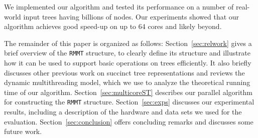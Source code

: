 We implemented our algorithm and tested its performance on a number of
real-world input trees having billions of nodes.
Our experiments showed that our algorithm achieves good speed-up on up to
64 cores and likely beyond.

The remainder of this paper is organized as follows:
Section~\ref{sec:relwork} gives a brief overview of the {\tt RMMT} structure,
to clearly define its structure and illustrate how it can be used to support
basic operations on trees efficiently.
It also briefly discusses other previous work on succinct tree representations
and reviews the dynamic multithreading model, which we use to analyze the
theoretical running time of our algorithm.
Section~\ref{sec:multicoreST} describes our parallel algorithm for constructing
the {\tt RMMT} structure.
Section~\ref{sec:exps} discusses our experimental results, including a
description of the hardware and data sets we used for the evaluation.
Section~\ref{sec:conclusion} offers concluding remarks and discusses some
future work.
